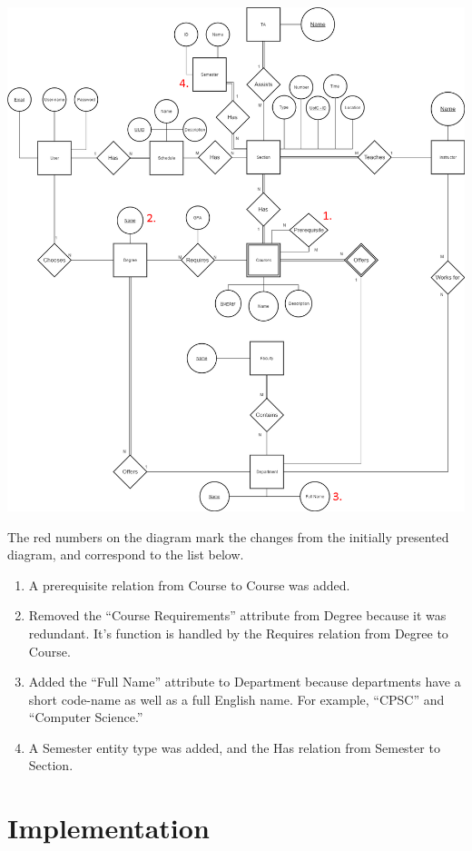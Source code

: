 \documentclass[twoside=false,a4paper,11pt]{article}
\theoremstyle{mytheor}
\begin{document}
\includegraphics[width=\textwidth]{ERDiagram.png}

The red numbers on the diagram mark the changes from the initially presented diagram, and correspond to the list below.

\begin{enumerate}
	\item A prerequisite relation from Course to Course was added.
	\item Removed the ``Course Requirements'' attribute from Degree because it was redundant. It's function is handled by the Requires relation from Degree to Course.
	\item Added the ``Full Name'' attribute to Department because departments have a short code-name as well as a full English name. For example, ``CPSC'' and ``Computer Science.''
	\item A Semester entity type was added, and the Has relation from Semester to Section.
\end{enumerate}

\section*{Implementation}
\end{document}

